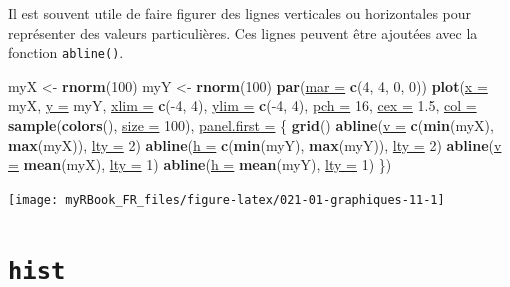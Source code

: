 \documentclass[twoside,symmetric]{book}
\newenvironment{Shaded}{}{}
\newcommand{\DataTypeTok}[1]{\underline{#1}}
\newcommand{\DecValTok}[1]{#1}
\newcommand{\FloatTok}[1]{#1}
\newcommand{\KeywordTok}[1]{\textbf{#1}}
\newcommand{\NormalTok}[1]{#1}
\newcommand{\OperatorTok}[1]{#1}
\newcommand{\StringTok}[1]{#1}
\begin{document}
Il est souvent utile de faire figurer des lignes verticales ou horizontales pour représenter des valeurs particulières. Ces lignes peuvent être ajoutées avec la fonction \texttt{abline()}.

\begin{Shaded}
\begin{Highlighting}[]
\NormalTok{myX <-}\StringTok{ }\KeywordTok{rnorm}\NormalTok{(}\DecValTok{100}\NormalTok{)}
\NormalTok{myY <-}\StringTok{ }\KeywordTok{rnorm}\NormalTok{(}\DecValTok{100}\NormalTok{)}
\KeywordTok{par}\NormalTok{(}\DataTypeTok{mar =} \KeywordTok{c}\NormalTok{(}\DecValTok{4}\NormalTok{, }\DecValTok{4}\NormalTok{, }\DecValTok{0}\NormalTok{, }\DecValTok{0}\NormalTok{)) }
\KeywordTok{plot}\NormalTok{(}\DataTypeTok{x =}\NormalTok{ myX, }\DataTypeTok{y =}\NormalTok{ myY, }
  \DataTypeTok{xlim =} \KeywordTok{c}\NormalTok{(}\OperatorTok{-}\DecValTok{4}\NormalTok{, }\DecValTok{4}\NormalTok{), }\DataTypeTok{ylim =} \KeywordTok{c}\NormalTok{(}\OperatorTok{-}\DecValTok{4}\NormalTok{, }\DecValTok{4}\NormalTok{),   }
  \DataTypeTok{pch =} \DecValTok{16}\NormalTok{, }\DataTypeTok{cex =} \FloatTok{1.5}\NormalTok{, }
  \DataTypeTok{col =} \KeywordTok{sample}\NormalTok{(}\KeywordTok{colors}\NormalTok{(), }\DataTypeTok{size =} \DecValTok{100}\NormalTok{),}
  \DataTypeTok{panel.first =}\NormalTok{ \{}
    \KeywordTok{grid}\NormalTok{()}
    \KeywordTok{abline}\NormalTok{(}\DataTypeTok{v =} \KeywordTok{c}\NormalTok{(}\KeywordTok{min}\NormalTok{(myX), }\KeywordTok{max}\NormalTok{(myX)), }\DataTypeTok{lty =} \DecValTok{2}\NormalTok{)}
    \KeywordTok{abline}\NormalTok{(}\DataTypeTok{h =} \KeywordTok{c}\NormalTok{(}\KeywordTok{min}\NormalTok{(myY), }\KeywordTok{max}\NormalTok{(myY)), }\DataTypeTok{lty =} \DecValTok{2}\NormalTok{)}
    \KeywordTok{abline}\NormalTok{(}\DataTypeTok{v =} \KeywordTok{mean}\NormalTok{(myX), }\DataTypeTok{lty =} \DecValTok{1}\NormalTok{)}
    \KeywordTok{abline}\NormalTok{(}\DataTypeTok{h =} \KeywordTok{mean}\NormalTok{(myY), }\DataTypeTok{lty =} \DecValTok{1}\NormalTok{)}
\NormalTok{\})}
\end{Highlighting}
\end{Shaded}

\texttt{[image: myRBook\_FR\_files/figure-latex/021-01-graphiques-11-1]}

\hypertarget{graph1hist}{%
\section{\texorpdfstring{\texttt{hist}}{hist}}\label{graph1hist}}
\end{document}
